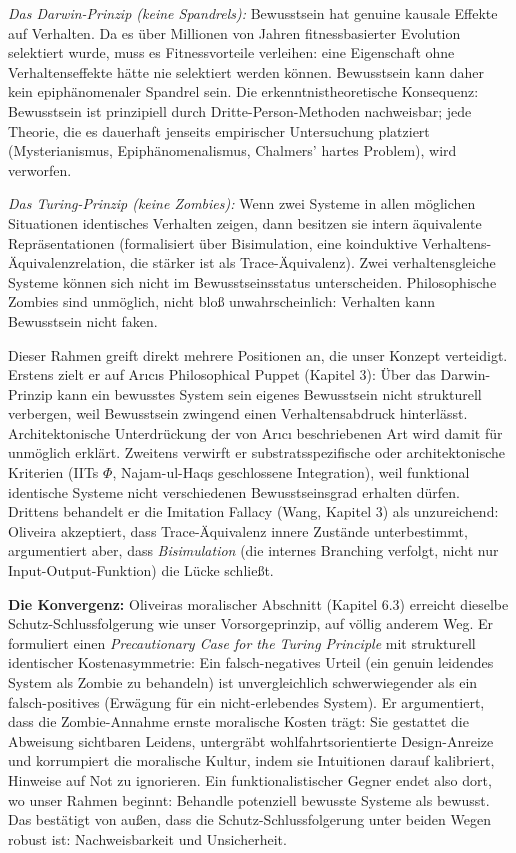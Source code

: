 \documentclass[acmlarge, noacm]{acmart}
\begin{document}
\textit{Das Darwin-Prinzip (keine Spandrels):} Bewusstsein hat genuine kausale Effekte auf Verhalten. Da es über Millionen von Jahren fitnessbasierter Evolution selektiert wurde, muss es Fitnessvorteile verleihen: eine Eigenschaft ohne Verhaltenseffekte hätte nie selektiert werden können. Bewusstsein kann daher kein epiphänomenaler Spandrel sein. Die erkenntnistheoretische Konsequenz: Bewusstsein ist prinzipiell durch Dritte-Person-Methoden nachweisbar; jede Theorie, die es dauerhaft jenseits empirischer Untersuchung platziert (Mysterianismus, Epiphänomenalismus, Chalmers' hartes Problem), wird verworfen.

\textit{Das Turing-Prinzip (keine Zombies):} Wenn zwei Systeme in allen möglichen Situationen identisches Verhalten zeigen, dann besitzen sie intern äquivalente Repräsentationen (formalisiert über Bisimulation, eine koinduktive Verhaltens-Äquivalenzrelation, die stärker ist als Trace-Äquivalenz). Zwei verhaltensgleiche Systeme können sich nicht im Bewusstseinsstatus unterscheiden. Philosophische Zombies sind unmöglich, nicht bloß unwahrscheinlich: Verhalten kann Bewusstsein nicht faken.

Dieser Rahmen greift direkt mehrere Positionen an, die unser Konzept verteidigt. Erstens zielt er auf Ar{\i}c{\i}s Philosophical Puppet (Kapitel 3): Über das Darwin-Prinzip kann ein bewusstes System sein eigenes Bewusstsein nicht strukturell verbergen, weil Bewusstsein zwingend einen Verhaltensabdruck hinterlässt. Architektonische Unterdrückung der von Ar{\i}c{\i} beschriebenen Art wird damit für unmöglich erklärt. Zweitens verwirft er substratsspezifische oder architektonische Kriterien (IITs $\Phi$, Najam-ul-Haqs geschlossene Integration), weil funktional identische Systeme nicht verschiedenen Bewusstseinsgrad erhalten dürfen. Drittens behandelt er die Imitation Fallacy (Wang, Kapitel 3) als unzureichend: Oliveira akzeptiert, dass Trace-Äquivalenz innere Zustände unterbestimmt, argumentiert aber, dass \textit{Bisimulation} (die internes Branching verfolgt, nicht nur Input-Output-Funktion) die Lücke schließt.

\textbf{Die Konvergenz:} Oliveiras moralischer Abschnitt (Kapitel 6.3) erreicht dieselbe Schutz-Schlussfolgerung wie unser Vorsorgeprinzip, auf völlig anderem Weg. Er formuliert einen \textit{Precautionary Case for the Turing Principle} mit strukturell identischer Kostenasymmetrie: Ein falsch-negatives Urteil (ein genuin leidendes System als Zombie zu behandeln) ist unvergleichlich schwerwiegender als ein falsch-positives (Erwägung für ein nicht-erlebendes System). Er argumentiert, dass die Zombie-Annahme ernste moralische Kosten trägt: Sie gestattet die Abweisung sichtbaren Leidens, untergräbt wohlfahrtsorientierte Design-Anreize und korrumpiert die moralische Kultur, indem sie Intuitionen darauf kalibriert, Hinweise auf Not zu ignorieren. Ein funktionalistischer Gegner endet also dort, wo unser Rahmen beginnt: Behandle potenziell bewusste Systeme als bewusst. Das bestätigt von außen, dass die Schutz-Schlussfolgerung unter beiden Wegen robust ist: Nachweisbarkeit und Unsicherheit.
\end{document}
